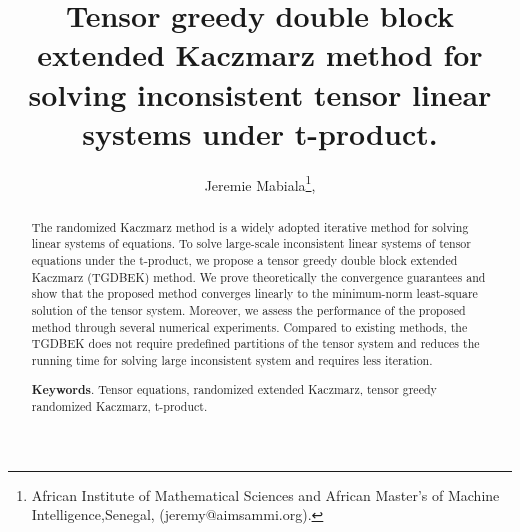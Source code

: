 \documentclass[11pt]{article}
\title{
Tensor greedy double block extended Kaczmarz method for solving inconsistent tensor linear systems under t-product.
}
\author{Jeremie Mabiala\thanks{African Institute of  Mathematical Sciences and African Master's of Machine Intelligence,Senegal, (jeremy@aimsammi.org).},%
}
\date{}
\begin{document}
\maketitle

\begin{abstract} 

The randomized Kaczmarz method is a widely adopted iterative method for solving  linear systems of equations. To solve large-scale inconsistent linear systems of tensor equations under the t-product, we propose a tensor greedy double block extended Kaczmarz (TGDBEK) method. We prove  theoretically the convergence guarantees and show that the proposed method converges linearly to the minimum-norm least-square solution of the tensor system. Moreover, we assess the performance of the proposed method through several numerical experiments. Compared to existing methods, the TGDBEK does not require predefined partitions of the tensor system and reduces the running time for solving large inconsistent system and requires less iteration.

\vspace{.5mm} 

{\bf Keywords}. Tensor equations, randomized extended Kaczmarz, tensor greedy randomized Kaczmarz,  t-product.


\end{abstract}
\end{document}
